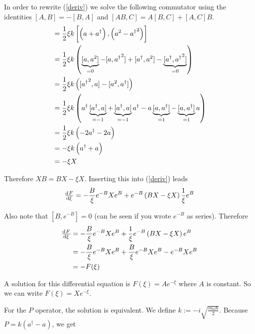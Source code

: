\documentclass[a4paper,german,12pt,smallheadings]{scrartcl}
\begin{document}
\begin{enumerate}[a)]
    In order to rewrite (\ref{deriv}) we solve the following commutator using
    the identities $[A,B] = -[B,A]$ and $[AB,C] = A[B,C] + [A,C]B$.
    \begin{align*}
      [X,B] &= \frac{1}{2} \xi k \left[\del{a+a^\dagger}, \del{a^2 - {a^\dagger}^2}\right] \\
            &= \frac{1}{2} \xi k \del{\underbrace{[a,a^2]}_{=0} - [a,{a^\dagger}^2] + [a^\dagger, a^2] - \underbrace{[a^\dagger, {a^\dagger}^2]}_{=0}} \\
            &= \frac{1}{2} \xi k \del{[{a^\dagger}^2, a] - [a^2, a^\dagger]} \\
            &= \frac{1}{2} \xi k \del{a^\dagger \underbrace{[a^\dagger,a] }_{=-1}+ \underbrace{[a^\dagger, a]}_{=-1}a^\dagger - a\underbrace{[a,a^\dagger]}_{=1} - \underbrace{[a,a^\dagger]}_{=1}a} \\
            &= \frac{1}{2} \xi k \del{-2a^\dagger -2a} \\
            &= -\xi k \del{a^\dagger + a} \\
            &= -\xi X
    \end{align*}

    Therefore $XB = BX - \xi X$. Inserting this into (\ref{deriv}) leads
    \begin{equation}
      \od{F}{\xi} = -\frac{B}{\xi}e^{-B}Xe^B + e^{-B} \del{BX - \xi X} \frac{1}{\xi}e^B
    \end{equation}

    Also note that $[B,e^{-B}] = 0$ (can be seen if you wrote $e^{-B}$ as series). Therefore
    \begin{align*}
      \od{F}{\xi} &= -\frac{B}{\xi}e^{-B}Xe^B + \frac{1}{\xi} e^{-B} \del{BX - \xi X} e^B \\
                  &= -\frac{B}{\xi}e^{-B}Xe^B + \frac{B}{\xi} e^{-B}Xe^B - e^{-B}Xe^{B} \\
                  &= -F(\xi)
    \end{align*}

    A solution for this differential equation is $F(\xi) = A e^{-\xi}$ where $A$
    is constant. So we can write $F(\xi) = Xe^{-\xi}$.

    For the $P$ operator, the solution is equivalent. We define $k := -i
    \sqrt{\frac{m \omega \hbar}{2}}$. Because $P = k(a^\dagger - a)$, we get


\end{enumerate}
\end{document}
